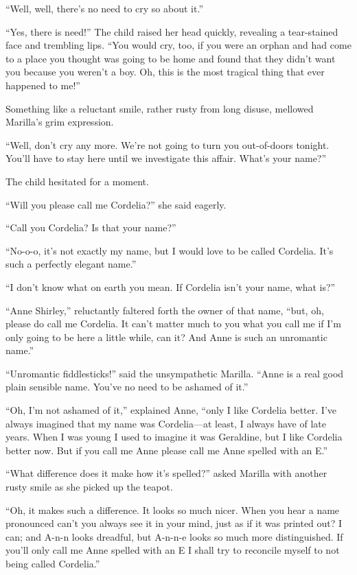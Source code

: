 \documentclass[a4paper]{article}
\begin{document}
``Well, well, there's no need to cry so about it.''

``Yes, there is need!'' The child raised her head quickly, revealing a tear-stained face and trembling lips. ``You would cry, too, if you were an orphan and had come to a place you thought was going to be home and found that they didn't want you because you weren't a boy. Oh, this is the most tragical thing that ever happened to me!''

Something like a reluctant smile, rather rusty from long disuse, mellowed Marilla's grim expression.

\rmfamily``Well, don't cry any more. We're not going to turn you out-of-doors tonight. You'll have to stay here until we investigate this affair. What's your name?''

The child hesitated for a moment.

``Will you please call me Cordelia?'' she said eagerly.

``Call you Cordelia? Is that your name?''

\ttfamily``No-o-o, it's not exactly my name, but I would love to be called Cordelia. It's such a perfectly elegant name.''

``I don't know what on earth you mean. If Cordelia isn't your name, what is?''

``Anne Shirley,'' reluctantly faltered forth the owner of that name, ``but, oh, please do call me Cordelia. It can't matter much to you what you call me if I'm only going to be here a little while, can it? And Anne is such an unromantic name.''

``Unromantic fiddlesticks!'' said the unsympathetic Marilla. ``Anne is a real good plain sensible name. You've no need to be ashamed of it.''

\sffamily``Oh, I'm not ashamed of it,'' explained Anne, ``only I like Cordelia better. \textrm{I've always imagined that my name was Cordelia---at least, I always have of late years.} When I was young I used to imagine it was Geraldine, but I like Cordelia better now. But if you call me Anne please call me Anne spelled with an E.''

``What difference does it make how it's spelled?'' asked Marilla with another rusty smile as she picked up the teapot.

\textrm{``Oh, it makes such a difference. It looks so much nicer. When you hear a name pronounced can't you always see it in your mind, just as if it was printed out? I can; and A-n-n looks dreadful, but A-n-n-e looks so much more distinguished. If you'll only call me Anne spelled with an E I shall try to reconcile myself to not being called Cordelia.''}
\end{document}
